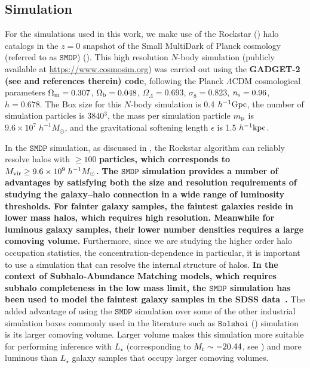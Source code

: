 \documentclass[twocolumn]{aastex61}
\begin{document}
\subsection{Simulation}

For the simulations used in this work, we make use of the Rockstar (\citealt{rockstar}) halo catalogs in the $z=0$ snapshot of the Small MultiDark of Planck cosmology (referred to as $\mathtt{SMDP}$) (\citealt{smallmultidark}). This high resolution $N$-body simulation (publicly available at \url{https://www.cosmosim.org}) was carried out using the 
{\bf \color{red} GADGET-2 (see \citealt{smallmultidark} and references therein) code}, 
following the Planck $\Lambda$CDM cosmological parameters 
$\Omega_{\rm m} = 0.307$, $\Omega_{\rm b} = 0.048$, $\Omega_{\Lambda} = 0.693$, $\sigma_{8} = 0.823$, $n_{\rm s}=0.96$, 
$h=0.678$. The Box size for this $N$-body simulation is 0.4 $h^{-1} \rm{Gpc}$, the number of simulation particles is 3840$^3$, the mass per simulation particle $m_{\rm p}$ is $9.6 \times 10^{7} \; h^{-1} M_{\odot}$, and the gravitational softening length $\epsilon$ is 1.5 $h^{-1} \rm{kpc}$.

In the $\mathtt{SMDP}$ simulation, as discussed in \citet{halodemographic}, the Rockstar algorithm can reliably resolve halos with $\geq 100$
{\bf \color{red} particles, which corresponds to $M_{\rm vir} \geq 9.6 \times 10^{9} \; h^{-1}M_{\odot}$.}
{\bf \color{red}
    The $\mathtt{SMDP}$ simulation provides a number of advantages by satisfying both the size 
    and resolution requirements of studying the galaxy--halo connection in a wide range of 
    luminosity thresholds. For fainter galaxy samples, the faintest galaxies reside in lower 
    mass halos, which requires high resolution. Meanwhile for luminous galaxy samples, their 
    lower number densities requires a large comoving volume. 
}
Furthermore, since we are studying the higher order halo occupation statistics, the concentration-dependence in particular, it is important to use a simulation that can resolve the internal structure of halos. 
{\bf \color{red}
    In the context of Subhalo-Abundance Matching models, which requires subhalo completeness 
    in the low mass limit, the $\mathtt{SMDP}$ simulation has been used to model the faintest 
    galaxy samples in the SDSS data~\citep[see][]{hod_vs_sham}. 
}
The added advantage of using the $\mathtt{SMDP}$ simulation over some of the other industrial simulation boxes commonly used in the literature such as $\mathtt{Bolshoi}$ (\citealt{Klypin2011,smallmultidark}) simulation is its larger comoving volume. Larger volume makes this simulation more suitable for performing inference with $L_{\star}$ (corresponding to $M_{\rm r} \sim -20.44$, see \citealt{blanton2003}) and more luminous than $L_{\star}$ galaxy samples that occupy larger comoving volumes.
\end{document}
